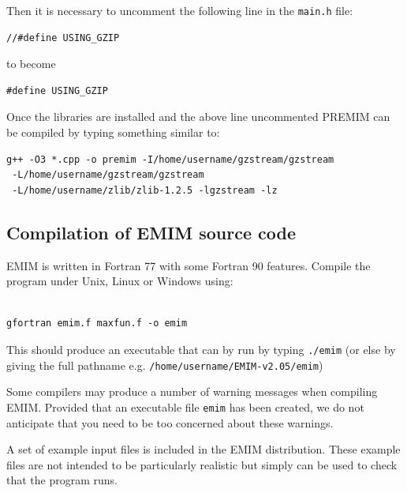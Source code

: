 \documentclass[a4paper,12pt]{article}
\newcommand{\code}[1]{{\footnotesize{{\tt #1}}}}
\begin{document}
Then it is necessary to uncomment the following line in the \code{main.h} file: 
\vspace{0.35cm} \begin{lstlisting}
//#define USING_GZIP 
\end{lstlisting} \vspace{0.35cm}
to become 
\vspace{0.35cm} \begin{lstlisting}
#define USING_GZIP 
\end{lstlisting} \vspace{0.35cm}
Once the libraries are installed and the above line uncommented PREMIM can be compiled by typing something similar to: 
\vspace{0.35cm} \begin{lstlisting}
g++ -O3 *.cpp -o premim -I/home/username/gzstream/gzstream
 -L/home/username/gzstream/gzstream
 -L/home/username/zlib/zlib-1.2.5 -lgzstream -lz

\end{lstlisting} \vspace{0.35cm}

\subsection{Compilation of EMIM source code}
\label{comp-emim}

EMIM is written in Fortran 77 with some Fortran 90 features. Compile the program under Unix, Linux or Windows using: 
\vspace{0.35cm} \begin{lstlisting}

gfortran emim.f maxfun.f -o emim

\end{lstlisting} \vspace{0.35cm}
This should produce an executable that can by run by typing \code{./emim} (or else by giving the full pathname e.g. \code{/home/username/EMIM-v2.05/emim}) 

Some compilers may produce a number of warning messages when compiling EMIM. Provided that an executable file \code{emim} has been created, we do not anticipate that you need to be too concerned about these warnings. 

A set of example input files is included in the EMIM distribution. These example files are not intended to be particularly realistic but simply can be used to check that the program runs. 
\end{document}
